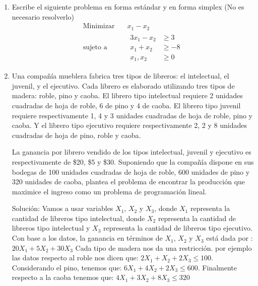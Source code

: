 \documentclass[twocolumn]{article}
\begin{document}
\begin{enumerate}
\item Escribe el siguiente problema en forma estándar y en forma simplex
(No es necesario resolverlo)
\begin{equation*}
\begin{aligned}
\text{Minimizar} \quad & x_{1}-x_{2}\\
\text{sujeto a} \quad &
  \begin{aligned}
   3x_{1}-x_{2} & \geq 3\\
   x_{1}+x_{2} &\geq -8\\
   x_{1},x_{2} &\geq 0
  \end{aligned}
\end{aligned}
\end{equation*}

\item Una compañía mueblera fabrica tres tipos de libreros: el
\guillemotleft{}intelectual\guillemotright{}, el \guillemotleft{}juvenil\guillemotright{}, y el \guillemotleft{}ejecutivo\guillemotright{}. Cada librero es
elaborado utilizando tres tipos de madera: roble, pino y caoba. El
librero tipo \guillemotleft{}intelectual\guillemotright{} requiere 2 unidades cuadradas de hoja de
roble, 6 de pino y 4 de caoba. El librero tipo \guillemotleft{}juvenil\guillemotright{} requiere
respectivamente 1, 4 y 3 unidades cuadradas de hoja de roble, pino
y caoba. Y el librero tipo \guillemotleft{}ejecutivo\guillemotright{} requiere respectivamente 2,
2 y 8 unidades cuadradas de hoja de pino, roble y caoba.

La ganancia por librero vendido de los tipos \guillemotleft{}intelectual\guillemotright{},
\guillemotleft{}juvenil\guillemotright{} y \guillemotleft{}ejecutivo\guillemotright{} es respectivamente de \$20, \$5 y
\$30. Suponiendo que la compañía dispone en sus bodegas de 100
unidades cuadradas de hoja de roble, 600 unidades de pino y 320
unidades de caoba, plantea el problema de encontrar la producción
que maximice el ingreso como un problema de programación lineal.

Solución: Vamos a usar variables $X_1$, $X_2$ y $X_3$, donde $X_1$ representa la cantidad de libreros tipo intelectual, donde $X_2$ representa la cantidad de libreros tipo intelectual y $X_3$ representa la cantidad de libreros tipo ejecutivo.
Con base a los datos, la ganancia en términos de $X_1$, $X_2$ y $X_3$ está dada por :$20X_1 +5X_2 + 30X_3$
Cada tipo de madera nos da una restricción. por ejemplo las datos respecto al roble nos dicen que:
$2X_1 +X_2 + 2X_3\leq 100$. Considerando el pino, tenemos que:
$6X_1 +4X_2 + 2X_3\leq 600$. Finalmente respecto a la caoba tenemos que: $4X_1 +3X_2 + 8X_3\leq 320$


\end{enumerate}
\end{document}
